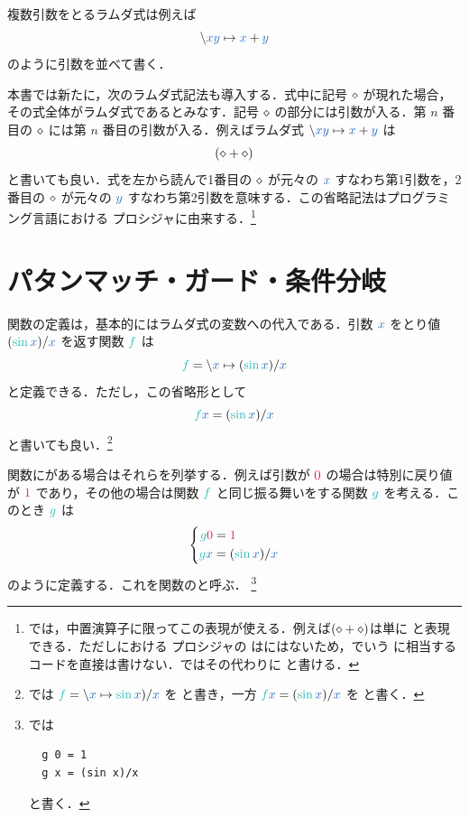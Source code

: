\documentclass[a5paper,twoside,fleqn,draft]{jsbook}
\begin{document}
複数引数をとるラムダ式は例えば
\begin{equation}
  \hLambdaSyntax{\hVar{x}\hVar{y}}{\hVar{x}+\hVar{y}}
\end{equation}
のように引数を並べて書く．

\separator

本書では新たに，次のラムダ式記法も導入する．式中に記号 $\diamond$ が現れた場合，その式全体がラムダ式であるとみなす．記号 $\diamond$ の部分には引数が入る．第 $n$ 番目の $\diamond$ には第 $n$ 番目の引数が入る．例えばラムダ式 $\hLambdaSyntax{\hVar{x}\hVar{y}}{\hVar{x}+\hVar{y}}$ は
\begin{equation}
  (\diamond+\diamond)
\end{equation}
と書いても良い．式を左から読んで1番目の $\diamond$ が元々の $\hVar{x}$ すなわち第1引数を，2番目の $\diamond$ が元々の $\hVar{y}$ すなわち第2引数を意味する．この省略記法はプログラミング言語\scheme における  プロシジャに由来する．\footnote{\haskell では，中置演算子に限ってこの表現が使える．例えば$(\diamond+\diamond)$は単に \code{(+)} と表現できる．ただし\scheme における  プロシジャの \code{<>} は\haskell にはないため，\scheme でいう  に相当するコードを直接は書けない．\haskell ではその代わりに  と書ける．}

\section{パタンマッチ・ガード・条件分岐}

関数の定義は，基本的にはラムダ式の変数への代入である．引数 $\hVar{x}$ をとり値 $(\hSin\hVar{x})/\hVar{x}$ を返す関数 $\hFunc{f}$ は
\begin{equation}
  \hFunc{f}=\hLambdaSyntax{\hVar{x}}{(\hSin\hVar{x})/\hVar{x}}
\end{equation}
と定義できる．ただし，この省略形として
\begin{equation}
  \hFunc{f}\hVar{x}
  =(\hSin\hVar{x})/\hVar{x}
\end{equation}
と書いても良い．\footnote{\haskell では $\hFunc{f}=\hLambdaSyntax{\hVar{x}}{\hSin\hVar{x})/\hVar{x}}$ を  と書き，一方 $\hFunc{f}\hVar{x}=(\hSin\hVar{x})/\hVar{x}$ を と書く．}

\separator

関数にがある場合はそれらを列挙する．例えば引数が $\hConstant{0}$ の場合は特別に戻り値が $\hConstant{1}$ であり，その他の場合は関数 $\hFunc{f}$ と同じ振る舞いをする関数 $\hFunc{g}$ を考える．このとき $\hFunc{g}$ は
\begin{equation}
  \left\{
  \begin{aligned}
    \hFunc{g}\hConstant{0}&=\hConstant{1}\\
    \hFunc{g}\hVar{x}&=(\hSin\hVar{x})/\hVar{x}
  \end{aligned}
  \right.
\end{equation}
のように定義する．これを関数のと呼ぶ．
\footnote{\haskell では
\begin{verbatim}
  g 0 = 1
  g x = (sin x)/x
\end{verbatim}
と書く．}
\end{document}
